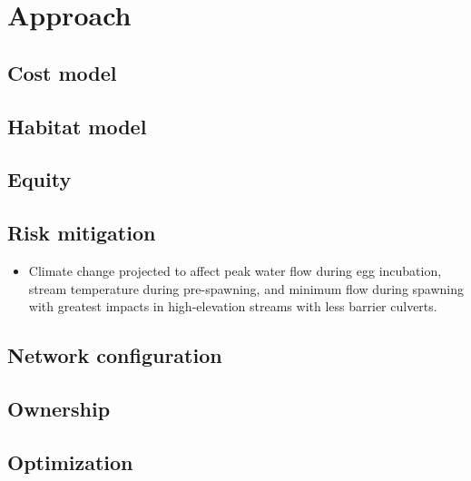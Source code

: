\documentclass[12pt]{elsarticle}
\begin{document}
%
\section{Approach}
\subsection{Cost model}
\subsection{Habitat model}
\subsection{Equity}
\subsection{Risk mitigation}

\begin{itemize}
\item Climate change projected to affect peak water flow during egg incubation, stream temperature during pre-spawning, and minimum flow during spawning \citet{battin2007projected} with greatest impacts in high-elevation streams with less barrier culverts. 
\end{itemize}

\subsection{Network configuration}
\subsection{Ownership}

\subsection{Optimization \label{sec:opt}}
\end{document}
